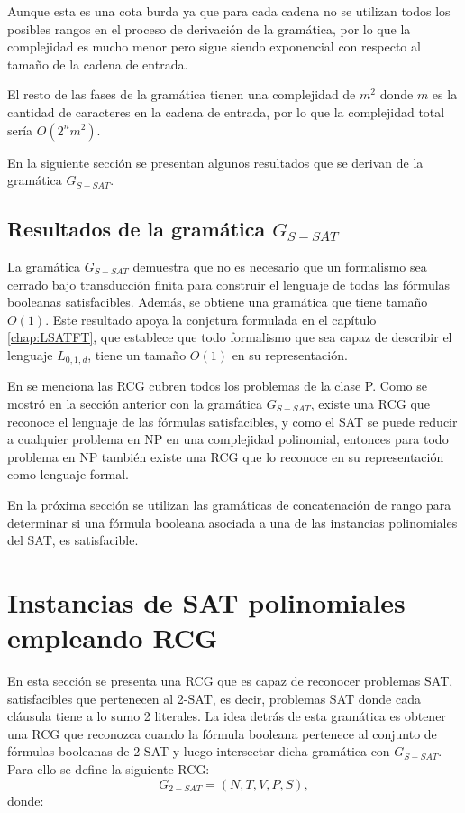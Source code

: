 Aunque esta es una cota burda ya que para cada cadena no se utilizan todos los posibles rangos en el proceso 
de derivación de la gramática, por lo que la complejidad es mucho menor pero sigue siendo exponencial con 
respecto al tamaño de la cadena de entrada.

El resto de las fases de la gramática tienen una complejidad de $m^2$ donde $m$
es la cantidad de caracteres en la cadena de entrada, por lo que la complejidad total sería $O(2^nm^2)$.

En la siguiente sección se presentan algunos resultados que se derivan de la gramática $G_{S-SAT}$.

\subsection{Resultados de la gramática $G_{S-SAT}$}

La gramática $G_{S-SAT}$ demuestra que no es necesario que un formalismo sea cerrado bajo transducción finita 
para construir el lenguaje de todas las fórmulas booleanas satisfacibles. Además, se obtiene una gramática 
que tiene tamaño $O(1)$. Este resultado apoya la conjetura formulada en el capítulo \ref{chap:LSATFT}, que establece
que todo formalismo que sea capaz de describir el lenguaje $L_{0,1,d}$, tiene un tamaño $O(1)$ en su representación.

En \cite{propertiesRCGBib2} se menciona las RCG cubren todos los problemas de la clase P. Como se mostró en la sección 
anterior con la gramática $G_{S-SAT}$, existe una RCG que reconoce el lenguaje de las fórmulas satisfacibles, 
y como el SAT se puede reducir a cualquier problema en NP en una complejidad polinomial, entonces para todo 
problema en NP también existe una RCG que lo reconoce en su representación como lenguaje formal. 

En la próxima sección se utilizan las gramáticas de concatenación de rango para determinar si una fórmula booleana
asociada a una de las instancias polinomiales del SAT, es satisfacible.

\section{Instancias de SAT polinomiales empleando RCG}
\label{sec:pSATRCG}

En esta sección se presenta una RCG que es capaz de reconocer problemas SAT, satisfacibles que pertenecen al 2-SAT, es decir, problemas SAT donde cada cláusula tiene a lo sumo 2 literales. La idea detrás de esta gramática es obtener una RCG que reconozca cuando la fórmula booleana pertenece al conjunto de fórmulas booleanas de 2-SAT y luego intersectar dicha gramática con $G_{S-SAT}$.  Para ello se define la siguiente RCG:
\[
    G_{2-SAT} = (N, T, V, P, S),
\]
donde:


